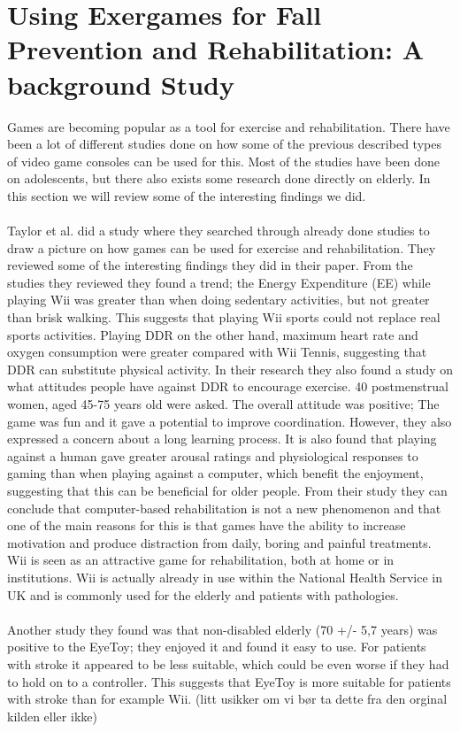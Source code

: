 \section{Using Exergames for Fall Prevention and Rehabilitation: A background Study}
Games are becoming popular as a tool for exercise and rehabilitation. There have been a lot of different studies done on how some of the previous described types of video game consoles can be used for this. Most of the studies have been done on adolescents, but there also exists some research done directly on elderly. In this section we will review some of the interesting findings we did.\\ \\
Taylor et al. \cite{taylor2011activity} did a study where they searched through already done studies to draw a picture on how games can be used for exercise and rehabilitation. They reviewed some of the interesting findings they did in their paper.  From the studies they reviewed they found a trend; the  Energy Expenditure (EE) while playing Wii was greater than when doing sedentary activities, but not greater than brisk walking. This suggests that playing Wii sports could not replace real sports activities. Playing DDR on the other hand, maximum heart rate and oxygen consumption were greater compared with Wii Tennis, suggesting that DDR can substitute physical activity.
In their research they also found a study on what attitudes people have against DDR to encourage exercise. 40 postmenstrual women, aged 45-75 years old were asked. The overall attitude was positive; The game was fun and it gave a potential to improve coordination. However, they also expressed a concern about a long learning process. It is also found that playing against a human gave greater arousal ratings and physiological responses to gaming than when playing against a computer, which benefit the enjoyment, suggesting that this can be beneficial for older people. 
From their study they can conclude that computer-based rehabilitation is not a new phenomenon and that one of the main reasons for this is that games have the ability to increase motivation and produce distraction from daily, boring and painful treatments. Wii is seen as an attractive game for rehabilitation, both at home or in institutions. Wii is actually already in use within the National Health Service in UK and is commonly used for the elderly and patients with pathologies. \cite{taylor2011activity} \\ \\
Another study they found was that non-disabled  elderly (70 +/- 5,7 years) was positive to the EyeToy; they enjoyed it and found it easy to use. For patients with stroke it appeared to be less suitable, which could be even worse if they had to hold on to a controller. This suggests that EyeToy is more suitable for patients with stroke than for example Wii.  (litt usikker om vi bør ta dette fra den orginal kilden eller ikke)
